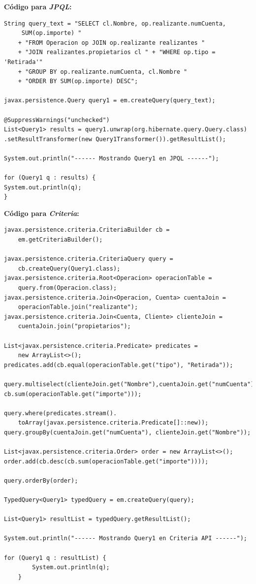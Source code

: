 \documentclass[11pt,a4paper]{article}
\begin{document}
\textbf{Código para \textit{JPQL}:}
\begin{lstlisting}
String query_text = "SELECT cl.Nombre, op.realizante.numCuenta,
	 SUM(op.importe) "
	+ "FROM Operacion op JOIN op.realizante realizantes "
	+ "JOIN realizantes.propietarios cl " + "WHERE op.tipo = 'Retirada'"
	+ "GROUP BY op.realizante.numCuenta, cl.Nombre " 
	+ "ORDER BY SUM(op.importe) DESC";

javax.persistence.Query query1 = em.createQuery(query_text);

@SuppressWarnings("unchecked")
List<Query1> results = query1.unwrap(org.hibernate.query.Query.class)
.setResultTransformer(new Query1Transformer()).getResultList();

System.out.println("------ Mostrando Query1 en JPQL ------");

for (Query1 q : results) {
System.out.println(q);
}

\end{lstlisting}
\textbf{Código para \textit{Criteria}:}
\begin{lstlisting}
javax.persistence.criteria.CriteriaBuilder cb = 
	em.getCriteriaBuilder();

javax.persistence.criteria.CriteriaQuery query = 
	cb.createQuery(Query1.class);
javax.persistence.criteria.Root<Operacion> operacionTable = 
	query.from(Operacion.class);
javax.persistence.criteria.Join<Operacion, Cuenta> cuentaJoin = 
	operacionTable.join("realizante");
javax.persistence.criteria.Join<Cuenta, Cliente> clienteJoin = 
	cuentaJoin.join("propietarios");

List<javax.persistence.criteria.Predicate> predicates = 
	new ArrayList<>();
predicates.add(cb.equal(operacionTable.get("tipo"), "Retirada"));

query.multiselect(clienteJoin.get("Nombre"),cuentaJoin.get("numCuenta"),
cb.sum(operacionTable.get("importe")));

query.where(predicates.stream().
	toArray(javax.persistence.criteria.Predicate[]::new));
query.groupBy(cuentaJoin.get("numCuenta"), clienteJoin.get("Nombre"));

List<javax.persistence.criteria.Order> order = new ArrayList<>();
order.add(cb.desc(cb.sum(operacionTable.get("importe"))));

query.orderBy(order);

TypedQuery<Query1> typedQuery = em.createQuery(query);

List<Query1> resultList = typedQuery.getResultList();

System.out.println("------ Mostrando Query1 en Criteria API ------");

for (Query1 q : resultList) {
		System.out.println(q);
	}

\end{lstlisting}
\end{document}
